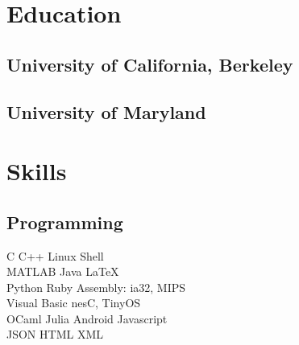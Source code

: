 \documentclass[letterpaper]{deedy-resume} %
\begin{document}
\begin{minipage}[t]{0.33\textwidth}%
\vspace{0.2cm}
\section{Education} 

\vspace{0.2cm}

\subsection{University of California, Berkeley}


\sectionspace %


\sectionspace %


\subsection{University of Maryland}


\sectionspace %


\section{Skills}

\vspace{0.2cm}

\subsection{Programming}

C \textbullet{} C++ \textbullet{} Linux Shell \\ 
MATLAB \textbullet{} Java \textbullet{} \LaTeX \\
Python \textbullet{} Ruby \textbullet{} Assembly: ia32, MIPS \\
Visual Basic \textbullet{} nesC, TinyOS\\
OCaml \textbullet{} Julia \textbullet{} Android \textbullet{} Javascript \\
JSON \textbullet{} HTML \textbullet{} XML\\


\end{minipage}
\end{document}
